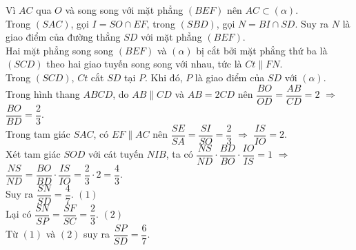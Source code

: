 \begin{ex}
{		Vì $AC$ qua $O$ và song song với  mặt phẳng $(BEF)$ nên $AC\subset(\alpha)$.\\
		Trong $(SAC)$, gọi $I=SO\cap EF$, trong $(SBD)$, gọi  $N=BI\cap SD$. Suy ra $N$ là giao điểm của đường thẳng $SD$ với mặt phẳng $(BEF)$.\\
		Hai mặt phẳng song song $(BEF)$ và $(\alpha)$ bị cắt bởi mặt phẳng thứ ba là $(SCD)$ theo hai giao tuyến song song  với nhau, tức là $Ct\parallel FN$.\\
		Trong $(SCD)$, $Ct$ cắt $SD$  tại $P$. Khi đó, $P$ là giao điểm của $SD$ với $(\alpha)$.\\
		Trong hình thang $ABCD$, do $AB\parallel CD$ và $AB=2CD$ nên  $\dfrac{BO}{OD}=\dfrac{AB}{CD}=2$ $\Rightarrow$ $\dfrac{BO}{BD}=\dfrac{2}{3}$.\\
		Trong tam giác $SAC$, có $EF\parallel AC$ nên  $\dfrac{SE}{SA}=\dfrac{SI}{SO}=\dfrac{2}{3}$ $\Rightarrow$ $\dfrac{IS}{IO}=2$.\\
		Xét tam giác  $SOD$ với cát tuyến $NIB$, ta có $\dfrac{NS}{ND}\cdot \dfrac{BD}{BO}\cdot \dfrac{IO}{IS}=1$ $\Rightarrow$ $\dfrac{NS}{ND}=\dfrac{BO}{BD}\cdot \dfrac{IS}{IO}=\dfrac{2}{3}\cdot 2=\dfrac{4}{3}$.\\
		Suy  ra $\dfrac{SN}{SD}=\dfrac{4}{7}$. \hfill $(1)$\\
		Lại có $\dfrac{SN}{SP}=\dfrac{SF}{SC}=\dfrac{2}{3}$. \hfill  $(2)$\\
		 Từ $(1)$ và $(2)$ suy ra $\dfrac{SP}{SD}=\dfrac{6}{7}$.
	 }
\end{ex}

